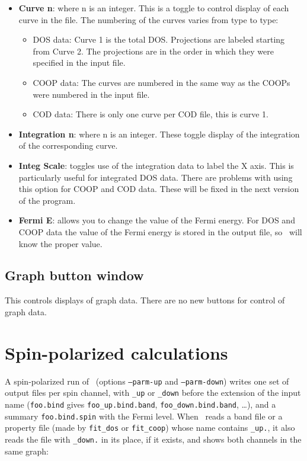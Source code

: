 \begin{itemize}
\item {\bf Curve n}: where n is an integer.  This is a toggle to
control display of each curve in the file.  The numbering of the
curves varies from type to type:  
\begin{itemize}
\item DOS data:  Curve 1 is the total DOS.  Projections are
labeled starting from Curve 2.  The projections are in the order in
which they were specified in the input file.

\item COOP data: The curves are numbered in the same way as the COOPs
were numbered in the input file.

\item COD data: There is only one curve per COD file, this is curve 1.
\end{itemize}

\item {\bf Integration n}: where n is an integer.  These toggle
display of
the integration of the corresponding curve.

\item {\bf Integ Scale}: toggles use of the integration data to label
the X axis.  This is particularly useful for integrated DOS data.
There are problems with using this option for COOP and COD data.
These will be fixed in the next version of the program.

\item {\bf Fermi E}: allows you to change the value of the Fermi energy.
For DOS and COOP data the value of the Fermi energy is stored in
the output file, so \viewprog\ will know the proper value.  

\end{itemize}

\subsection{Graph button window}

This controls displays of graph data.  There are no new buttons for
control of graph data.

\section{Spin-polarized calculations}

A spin-polarized run of \calcprog\ (options {\tt --parm-up} and
{\tt --parm-down}) writes one set of output files per spin channel,
with {\tt \_up} or {\tt \_down} before the extension of the input name
({\tt foo.bind} gives {\tt foo\_up.bind.band}, {\tt foo\_down.bind.band},
\ldots), and a summary {\tt foo.bind.spin} with the Fermi level. When
\viewprog\ reads a band file or a property file (made by {\tt fit\_dos}
or {\tt fit\_coop}) whose name contains {\tt \_up.}, it also reads the
file with {\tt \_down.} in its place, if it exists, and shows both
channels in the same graph:

